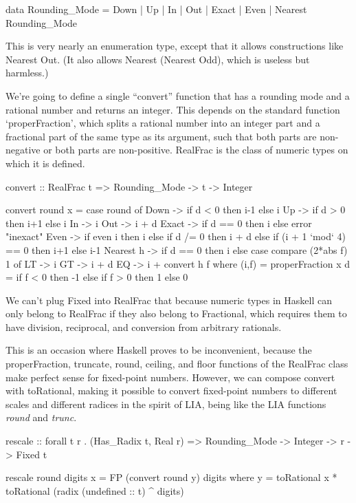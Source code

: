 \documentclass{article}
\begin{document}
\begin{code}
data Rounding_Mode
   = Down
   | Up
   | In
   | Out
   | Exact
   | Even
   | Nearest Rounding_Mode
\end{code}

This is very nearly an enumeration type, except that it
allows constructions like Nearest Out.  (It also allows
Nearest (Nearest Odd), which is useless but harmless.)

We're going to define a single ``convert'' function that has
a rounding mode and a rational number and returns an integer.
This depends on the standard function `properFraction',
which splits a rational number into an integer part and
a fractional part of the same type as its argument, such
that both parts are non-negative or both parts are non-positive.
RealFrac is the class of numeric types on which it is defined.

\begin{code}
convert :: RealFrac t => Rounding_Mode -> t -> Integer

convert round x =
  case round of
    Down      -> if d < 0 then i-1 else i
    Up        -> if d > 0 then i+1 else i
    In        -> i
    Out       -> i + d
    Exact     -> if d == 0 then i else error "inexact"
    Even      -> if even i then i else
                 if d /= 0 then i + d else
                 if (i + 1 `mod` 4) == 0 then i+1 else i-1
    Nearest h -> if d == 0 then i else
                 case compare (2*abs f) 1 of
                   LT -> i
                   GT -> i + d
                   EQ -> i + convert h f
  where (i,f) = properFraction x
        d     = if f < 0 then -1 else if f > 0 then 1 else 0
\end{code}

We can't plug Fixed into RealFrac that because numeric types
in Haskell can only belong to RealFrac if they also belong to
Fractional, which requires them to have division, reciprocal,
and conversion from arbitrary rationals.

This is an occasion where Haskell proves to be inconvenient,
because the properFraction, truncate, round, ceiling, and floor
functions of the RealFrac class make perfect sense for
fixed-point numbers.  However, we can compose convert with
toRational, making it possible to convert fixed-point numbers
to different scales and different radices in the spirit of LIA,
being like  the LIA functions {\it round} and {\it trunc}.

\begin{code}
rescale :: forall t r . (Has_Radix t, Real r) =>
          Rounding_Mode -> Integer -> r -> Fixed t

rescale round digits x = FP (convert round y) digits
  where y = toRational x * toRational (radix (undefined :: t) ^ digits)
\end{code}
\end{document}
